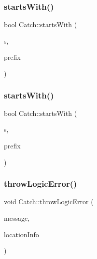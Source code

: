 \subsubsection{\texorpdfstring{starts\+With()}{startsWith()}\hspace{0.1cm}{\footnotesize\ttfamily [1/2]}}
{\footnotesize\ttfamily bool Catch\+::starts\+With (\begin{DoxyParamCaption}\item[{\textbf{ std\+::string} const \&}]{s,  }\item[{\textbf{ std\+::string} const \&}]{prefix }\end{DoxyParamCaption})}

\mbox{\label{namespace_catch_acad23751846ac23d0f379e34f5adebb1}} 
\subsubsection{\texorpdfstring{starts\+With()}{startsWith()}\hspace{0.1cm}{\footnotesize\ttfamily [2/2]}}
{\footnotesize\ttfamily bool Catch\+::starts\+With (\begin{DoxyParamCaption}\item[{\textbf{ std\+::string} const \&}]{s,  }\item[{char}]{prefix }\end{DoxyParamCaption})}

\mbox{\label{namespace_catch_a702b612f683d154c466ea8297ed4a20d}} 
\subsubsection{\texorpdfstring{throw\+Logic\+Error()}{throwLogicError()}}
{\footnotesize\ttfamily void Catch\+::throw\+Logic\+Error (\begin{DoxyParamCaption}\item[{\textbf{ std\+::string} const \&}]{message,  }\item[{\hyperlink{struct_catch_1_1_source_line_info}{Source\+Line\+Info} const \&}]{location\+Info }\end{DoxyParamCaption})}

\mbox{\label{namespace_catch_ac036a17412d318598ffda8e1fe7a1177}} 
